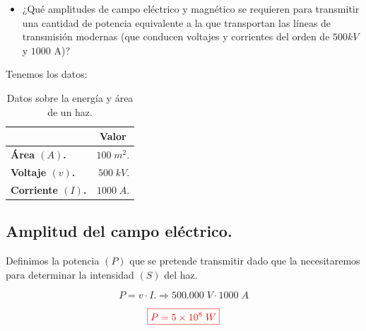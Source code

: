 \documentclass[a4paper,12pt]{article} %
\begin{document}
\begin{itemize}
    \item ¿Qué amplitudes de campo eléctrico y magnético se requieren para transmitir una cantidad de potencia equivalente a la que transportan
    las líneas de transmisión modernas (que conducen voltajes y corrientes del orden de \(500 kV\) y \(1000\) A)?
\end{itemize}

\vspace{\baselineskip}


\begin{justify}
    Tenemos los datos:
\end{justify}

\begin{table}[h]
    \centering
    \renewcommand{\arraystretch}{1.5} %
    \begin{tabular}{|>{\bfseries}l|r|} %
    \hline
    \multicolumn{1}{|c|}{\textbf{Variable}} & \multicolumn{1}{c|}{\textbf{Valor}} \\
    \hline
    Área  \((A)\). & \( 100 \;m^2.\)  \\
    \hline
    Voltaje \((v)\). &\( 500 \; kV.\) \\
    \hline
    Corriente \((I)\). &  \(1000 \; A\). \\
    \hline
    \end{tabular}
    \caption{Datos sobre la energía y área de un haz.}
\end{table}

\vspace{\baselineskip}

\subsection{Amplitud del campo eléctrico.}

\vspace{\baselineskip}

\begin{justify}
    Definimos la potencia \((P)\) que se pretende transmitir dado que la necesitaremos para determinar la intensidad \((S)\) del haz.
\end{justify}

\[ P = v \cdot I. \Rightarrow 500.000 \; V \cdot 1000 \; A\]

\[ \textcolor{red}{\boxed{P = 5 \times 10^8 \; W}}\]

\vspace{\baselineskip}
\end{document}
